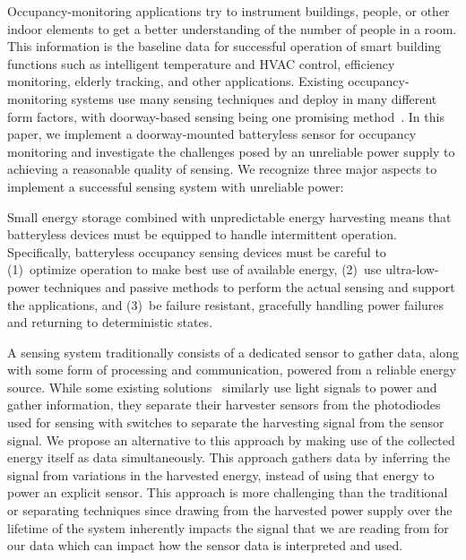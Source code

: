 Occupancy-monitoring applications try to instrument buildings, people, or other indoor elements to get a better understanding of the number of people in a room.
This information is the baseline data for successful operation of smart building functions such as intelligent temperature and HVAC control, efficiency monitoring, elderly tracking, and other applications.
Existing occupancy-monitoring systems use many sensing techniques and deploy in many different form factors, with doorway-based sensing being one promising method~\cite{hnat2012doorjamb, sonicdoor-buildsys2017}.
In this paper, we implement a doorway-mounted batteryless sensor for occupancy monitoring and investigate the challenges posed by an unreliable power supply to achieving a reasonable quality of sensing.
We recognize three major aspects to implement a successful sensing system with unreliable power:

Small energy storage combined with unpredictable energy harvesting means that batteryless devices must be equipped to handle intermittent operation.
Specifically, batteryless occupancy sensing devices must be careful to (1)~optimize operation to make best use of available energy, (2)~use ultra-low-power techniques and passive methods to perform the actual sensing and support the applications, and (3)~be failure resistant, gracefully handling power failures and returning to deterministic states.

A sensing system traditionally consists of a dedicated sensor to gather data, along with some form of processing and communication, powered from a reliable energy source.  While some existing solutions~\cite{li2018self} similarly use light signals to power and gather information, they separate their harvester sensors from the photodiodes used for sensing with switches to separate the harvesting signal from the sensor signal.  
We propose an alternative to this approach by making use of the collected energy itself as data simultaneously.  This approach gathers data by inferring the signal from variations in the harvested energy, instead of using that energy to power an explicit sensor.  This approach is more challenging than the traditional or separating techniques since drawing from the harvested power supply over the lifetime of the system inherently impacts the signal that we are reading from for our data which can impact how the sensor data is interpreted and used.

